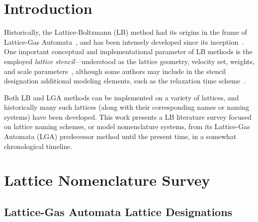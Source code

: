 \section{Introduction}

    Historically,   the   Lattice-Boltzmann   (LB)    method    had    its    origins    in    the    frame    of    Lattice-Gas
    Automata~\cite{1988-McNamaraGR+ZanettiG-PhysRevLett},     and     has     been     intensely     developed     since     its
    inception~\cite{1992-BenziR+VergassolaM-PhysRep,       1998-ChenS+DoolenGD-AnnuRevFluidMech,        2011-MohamadAA-Springer,
    2018-KrugerT+ViggenEM-Springer}. One important conceptual and implementational parameter  of  LB  methods  is  the  employed
    \emph{lattice    stencil}---understood    as    the    lattice    geometry,    velocity    set,    weights,    and     scale
    parameters~\cite{2013-HegeleJr+PhilippiPC-JSciComput,                                2013-MattilaKK+PhilippiPC-IntJModPhysC,
    2014-MattilaKK+PhilippiPC-SciWorldJ}, although some authors may include  in  the  stencil  designation  additional  modeling
    elements, such as the relaxation time scheme~\cite{2017-LiL+KlausnerJF-IntJHeatMassTran}.

    Both LB and LGA methods can be implemented on a variety of lattices, and historically many such lattices (along  with  their
    corresponding names or naming systems) have been developed. This work presents a LB literature  survey  focused  on  lattice
    naming schemes, or model nomenclature systems, from its Lattice-Gas Automata (LGA)  predecessor  method  until  the  present
    time, in a somewhat chronological timeline.



\section{Lattice Nomenclature Survey}

    \subsection{Lattice-Gas Automata Lattice Designations}

